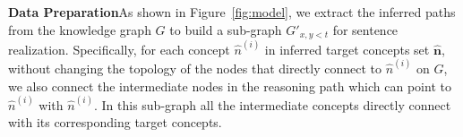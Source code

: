 \documentclass[letterpaper]{article} %
\begin{document}
\medskip\noindent\textbf{Data Preparation}\hspace{1em}As shown in Figure~\ref{fig:model}, we extract the inferred paths from the knowledge graph $G$ to build a sub-graph $G'_{x,y<t}$ for sentence realization. Specifically, for each concept $\hat{n}^{(i)}$ in inferred target concepts set $\bm{\hat{n}}$, without changing the topology of the nodes that directly connect to $\hat{n}^{(i)}$ on $G$, we also connect the intermediate nodes in the reasoning path which can point to $\hat{n}^{(i)}$ with $\hat{n}^{(i)}$. In this sub-graph all the intermediate concepts directly connect with its corresponding target concepts.

\end{document}
